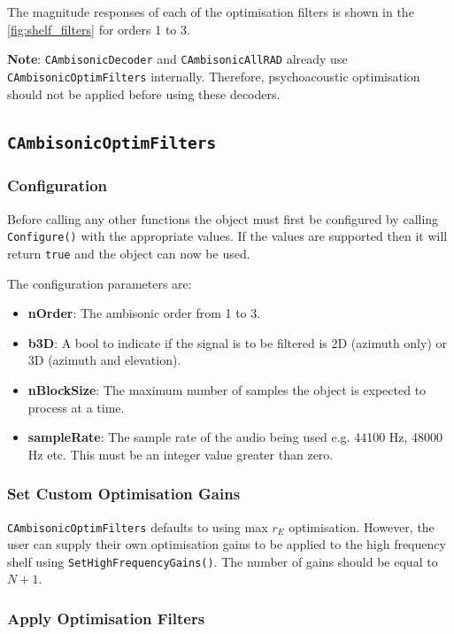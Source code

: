 \documentclass[12pt]{report}
\newcommand{\code}[1]{\texttt{#1}}
\begin{document}
The magnitude responses of each of the optimisation filters is shown in the \cref{fig:shelf_filters} for orders 1 to 3.

\textbf{Note}: \code{CAmbisonicDecoder} and \code{CAmbisonicAllRAD} already use \code{CAmbisonicOptimFilters} internally. Therefore, psychoacoustic optimisation should not be applied before using these decoders.

\subsection{\code{CAmbisonicOptimFilters}}

\subsubsection{Configuration}

Before calling any other functions the object must first be configured by calling \code{Configure()} with the appropriate values. If the values are supported then it will return \code{true} and the object can now be used.

The configuration parameters are:
\begin{itemize}
    \item \textbf{nOrder}: The ambisonic order from 1 to 3.
    \item \textbf{b3D}: A bool to indicate if the signal is to be filtered is 2D (azimuth only) or 3D (azimuth and elevation).
    \item \textbf{nBlockSize}: The maximum number of samples the object is expected to process at a time.
    \item \textbf{sampleRate}: The sample rate of the audio being used e.g. 44100 Hz, 48000 Hz etc. This must be an integer value greater than zero.
\end{itemize}

\subsubsection{Set Custom Optimisation Gains}

\code{CAmbisonicOptimFilters} defaults to using max $r_{E}$ optimisation. However, the user can supply their own optimisation gains to be applied to the high frequency shelf using \code{SetHighFrequencyGains()}. The number of gains should be equal to $N + 1$.

\subsubsection{Apply Optimisation Filters}
\end{document}
